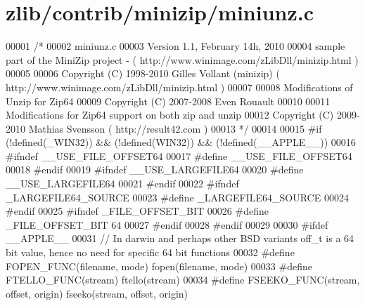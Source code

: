 \hypertarget{zlib_2contrib_2minizip_2miniunz_8c_source}{}\section{zlib/contrib/minizip/miniunz.c}
\label{zlib_2contrib_2minizip_2miniunz_8c_source}

\begin{DoxyCode}
00001 \textcolor{comment}{/*}
00002 \textcolor{comment}{   miniunz.c}
00003 \textcolor{comment}{   Version 1.1, February 14h, 2010}
00004 \textcolor{comment}{   sample part of the MiniZip project - ( http://www.winimage.com/zLibDll/minizip.html )}
00005 \textcolor{comment}{}
00006 \textcolor{comment}{         Copyright (C) 1998-2010 Gilles Vollant (minizip) ( http://www.winimage.com/zLibDll/minizip.html )}
00007 \textcolor{comment}{}
00008 \textcolor{comment}{         Modifications of Unzip for Zip64}
00009 \textcolor{comment}{         Copyright (C) 2007-2008 Even Rouault}
00010 \textcolor{comment}{}
00011 \textcolor{comment}{         Modifications for Zip64 support on both zip and unzip}
00012 \textcolor{comment}{         Copyright (C) 2009-2010 Mathias Svensson ( http://result42.com )}
00013 \textcolor{comment}{*/}
00014 
00015 \textcolor{preprocessor}{#if (!defined(\_WIN32)) && (!defined(WIN32)) && (!defined(\_\_APPLE\_\_))}
00016 \textcolor{preprocessor}{        #ifndef \_\_USE\_FILE\_OFFSET64}
00017 \textcolor{preprocessor}{                #define \_\_USE\_FILE\_OFFSET64}
00018 \textcolor{preprocessor}{        #endif}
00019 \textcolor{preprocessor}{        #ifndef \_\_USE\_LARGEFILE64}
00020 \textcolor{preprocessor}{                #define \_\_USE\_LARGEFILE64}
00021 \textcolor{preprocessor}{        #endif}
00022 \textcolor{preprocessor}{        #ifndef \_LARGEFILE64\_SOURCE}
00023 \textcolor{preprocessor}{                #define \_LARGEFILE64\_SOURCE}
00024 \textcolor{preprocessor}{        #endif}
00025 \textcolor{preprocessor}{        #ifndef \_FILE\_OFFSET\_BIT}
00026 \textcolor{preprocessor}{                #define \_FILE\_OFFSET\_BIT 64}
00027 \textcolor{preprocessor}{        #endif}
00028 \textcolor{preprocessor}{#endif}
00029 
00030 \textcolor{preprocessor}{#ifdef \_\_APPLE\_\_}
00031 \textcolor{comment}{// In darwin and perhaps other BSD variants off\_t is a 64 bit value, hence no need for specific 64 bit
       functions}
00032 \textcolor{preprocessor}{#define FOPEN\_FUNC(filename, mode) fopen(filename, mode)}
00033 \textcolor{preprocessor}{#define FTELLO\_FUNC(stream) ftello(stream)}
00034 \textcolor{preprocessor}{#define FSEEKO\_FUNC(stream, offset, origin) fseeko(stream, offset, origin)}

\end{DoxyCode}
